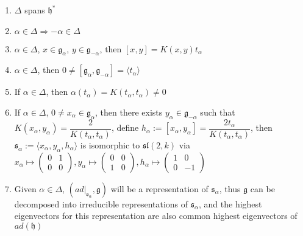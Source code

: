 \documentclass[main]{subfiles}
\begin{document}
\begin{proposition}\label{Some properties about root space decomposition} \hfill
\begin{enumerate}[leftmargin=*,label=\textit{(\alph*)}]
\item $\Delta$ spans $\mathfrak{h}^*$
\item $\alpha\in\Delta\Rightarrow -\alpha\in\Delta$
\item $\alpha\in\Delta$, $x\in\mathfrak{g}_\alpha$, $y\in\mathfrak{g}_{-\alpha}$, then $[x,y]=K(x,y)t_\alpha$
\item $\alpha\in\Delta$, then $0\neq[\mathfrak{g}_{\alpha},\mathfrak{g}_{-\alpha}]=\langle t_\alpha\rangle$
\item If $\alpha\in\Delta$, then $\alpha(t_\alpha)=K(t_\alpha,t_\alpha)\neq0$
\item If $\alpha\in\Delta$, $0\neq x_\alpha\in\mathfrak{g}_\alpha$, then there exists $y_\alpha\in\mathfrak{g}_{-\alpha}$ such that $K(x_\alpha,y_\alpha)=\dfrac{2}{K(t_\alpha,t_\alpha)}$, define $h_\alpha:=[x_\alpha,y_\alpha]=\dfrac{2t_\alpha}{K(t_\alpha,t_\alpha)}$, then $\mathfrak{s}_\alpha:=\langle x_\alpha,y_\alpha,h_\alpha\rangle$ is isomorphic to $\mathfrak{sl}(2,k)$ via $x_\alpha\mapsto\begin{pmatrix}
0&1 \\
0&0
\end{pmatrix},y_\alpha\mapsto\begin{pmatrix}
0&0 \\
1&0
\end{pmatrix},h_\alpha\mapsto\begin{pmatrix}
1&0 \\
0&-1
\end{pmatrix}$
\item Given $\alpha\in\Delta$, $(ad|_{\mathfrak{s}_\alpha},\mathfrak{g})$ will be a representation of $\mathfrak{s}_\alpha$, thus $\mathfrak{g}$ can be decomposed into irreducible representations of $\mathfrak{s}_\alpha$, and the highest eigenvectors for this representation are also common highest eigenvectors of $ad(\mathfrak{h})$
\end{enumerate}
\end{proposition}
\end{document}
